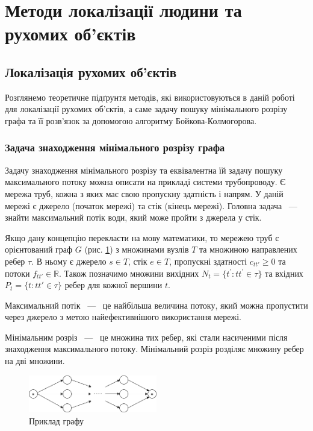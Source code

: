\section{Методи локалізації людини та рухомих об'єктів}
\vspace{-\baselineskip}
\subsection{Локалізація рухомих об'єктів}

Розглянемо теоретичне підґрунтя методів, які використовуються в даній роботі для
локалізації рухомих об'єктів, а саме задачу пошуку мінімального розрізу графа
та її розв'язок за допомогою алгоритму Бойкова-Колмогорова.

\subsubsection{Задача знаходження мінімального розрізу графа}

Задачу знаходження мінімального розрізу та еквівалентна їй задачу пошуку максимального потоку
можна описати на прикладі системи трубопроводу.
Є мережа труб, кожна з яких має свою пропускну здатність і напрям.
У даній мережі є джерело (початок мережі) та стік (кінець мережі).
Головна задача ~---~ знайти максимальний потік води,
який може пройти з джерела у стік.

Якщо дану концепцію перекласти на мову
математики, то мережею труб є орієнтований граф $G$ (рис. \ref{fig:graph_example})
з множинами вузлів $T$ та множиною направлених ребер $\tau$.
В ньому є джерело $s \in T$, стік $e \in T$, пропускні здатності $c_{tt'} \ge 0$
та потоки $f_{tt'} \in \mathbb{R}$.
Також позначимо множини вихідних $N_t = \{t^{'}: tt^{'} \in \tau \}$
та вхідних $P_t = \{t: tt' \in \tau \}$ ребер для кожної вершини $t$.
\begin{definition}
    Максимальний потік ~---~  це найбільша величина потоку, який
    можна пропустити через джерело з метою найефективнішого  використання мережі.
\end{definition}

\begin{definition}
    Мінімальним розріз ~---~ це множина тих ребер, які стали насиченими після знаходження максимального
    потоку. Мінімальний розріз розділяє множину ребер на дві множини.
\end{definition}
\begin{figure}[H]
    \centering
    \includegraphics[width=0.5\textwidth]{images/graph_example}
    \caption{Приклад графу
        \label{fig:graph_example}
    }
\end{figure}

